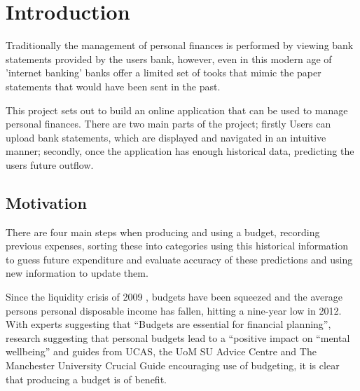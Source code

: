 \chapter{Introduction}

\begin{comment}
This chapter puts the work into context. Having read it, the reader should be left in no doubt as to:

- the topic area to which the work applies
- why the work is being done
- what else has been done in the area and by whom
 - how the author proposes to tackle the problem: The project proposal is often expressed in terms of a main objective and possibly one or more additional objectives. It is useful to define "milestones" or "sub-goals" that mark the progress towards the objectives. 
 - It is common to end this chapter with a brief overview of each of the subsequent chapters of the report.
\end{comment}

Traditionally the management of personal finances is performed by viewing bank statements provided by the users bank, however, even in this modern age of 'internet banking' banks offer a limited set of tooks that mimic the paper statements that would have been sent in the past.

This project sets out to build an online application that can be used to manage personal finances. There are two main parts of the project; firstly Users can upload  bank statements, which are displayed and navigated in an intuitive manner; secondly, once the application has enough historical data, predicting the users future outflow.

\section{Motivation}
There are four main steps when producing and using a budget, recording previous expenses, sorting these into categories
using this historical information to guess future expenditure and evaluate accuracy of these predictions and using new information to update them.

Since the liquidity crisis of 2009 \cite{gore2010}, budgets have been squeezed and the average persons personal disposable income has fallen, hitting a nine-year low in 2012\cite{barnard2012households}. With experts suggesting that ``Budgets are essential for financial planning''\cite{wsj2013budget}, research suggesting that personal budgets lead to a ``positive impact on ``mental wellbeing''\cite{tlap2013budget} and guides from UCAS, the UoM SU Advice Centre and The Manchester University Crucial Guide encouraging use of budgeting, it is clear that producing a budget is of benefit.


